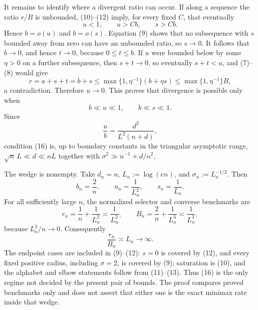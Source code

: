 It remains to identify where a divergent ratio can occur.  If along a sequence the ratio \(r/B\) is unbounded, (10)--(12) imply, for every fixed \(C\), that eventually
\[
 u<1,\qquad u>Cb,\qquad s>Cb.
\tag{14}
\]
Hence \(b=o(u)\) and \(b=o(s)\).  Equation (9) shows that no subsequence with \(s\) bounded away from zero can have an unbounded ratio, so \(s\to0\).  It follows that \(b\to0\), and hence \(t\to0\), because \(0\le t\le b\).  If \(u\) were bounded below by some \(\eta>0\) on a further subsequence, then \(s+t\to0\), so eventually \(s+t<u\), and (7)--(8) would give
\[
 r=a+s+t=b+s
 \le\max\{1,\eta^{-1}\}(b+\eta s)
 \le\max\{1,\eta^{-1}\}B,
\tag{15}
\]
a contradiction.  Therefore \(u\to0\).  This proves that divergence is possible only when
\[
 b\ll u\ll1,
 \qquad b\ll s\ll1.
\tag{16}
\]
Since
\[
 \frac ub=\frac{d^2}{L^2(n+d)},
\tag{17}
\]
condition (16) is, up to boundary constants in the triangular asymptotic range, \(\sqrt n\,L\ll d\ll nL\) together with \(\sigma^2\gg n^{-1}+d/n^2\).

The wedge is nonempty.  Take \(d_n=n\), \(L_n:=\log(en)\), and \(\sigma_n:=L_n^{-1/2}\).  Then
\[
 b_n=\frac2n,\qquad u_n=\frac1{L_n^2},\qquad s_n=\frac1{L_n}.
\tag{18}
\]
For all sufficiently large \(n\), the normalized selector and converse benchmarks are
\[
 r_n=\frac1n+\frac1{L_n^2}\asymp\frac1{L_n^2},
 \qquad
 B_n=\frac2n+\frac1{L_n^3}\asymp\frac1{L_n^3},
\tag{19}
\]
because \(L_n^3/n\to0\).  Consequently
\[
 \frac{r_n}{B_n}\asymp L_n\longrightarrow\infty.
\tag{20}
\]
The endpoint cases are included in (9)--(12): \(s=0\) is covered by (12), and every fixed positive radius, including \(\sigma=2\), is covered by (9); saturation is (10), and the alphabet and elbow statements follow from (11)--(13).  Thus (16) is the only regime not decided by the present pair of bounds.  The proof compares proved benchmarks only and does not assert that either one is the exact minimax rate inside that wedge.